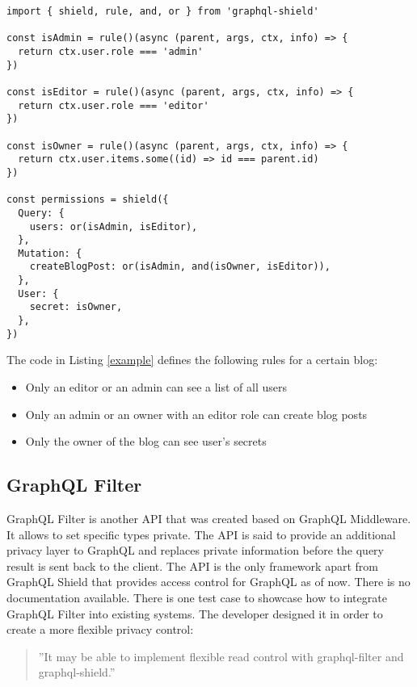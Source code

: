\documentclass[conference]{IEEEtran}
\begin{document}
\label{example}
\begin{lstlisting}[label=example,caption=Role-based Access Control \cite{b1}]
import { shield, rule, and, or } from 'graphql-shield'

const isAdmin = rule()(async (parent, args, ctx, info) => {
  return ctx.user.role === 'admin'
})

const isEditor = rule()(async (parent, args, ctx, info) => {
  return ctx.user.role === 'editor'
})

const isOwner = rule()(async (parent, args, ctx, info) => {
  return ctx.user.items.some((id) => id === parent.id)
})

const permissions = shield({
  Query: {
    users: or(isAdmin, isEditor),
  },
  Mutation: {
    createBlogPost: or(isAdmin, and(isOwner, isEditor)),
  },
  User: {
    secret: isOwner,
  },
})
\end{lstlisting}

The code in Listing \ref{example} defines the following rules for a certain blog:

\begin{itemize}
    \item Only an editor or an admin can see a list of all users
    \item Only an admin or an owner with an editor role can create blog posts
    \item Only the owner of the blog can see user's secrets
\end{itemize}


\subsection{GraphQL Filter}\label{filter}

GraphQL Filter is another API that was created based on GraphQL Middleware. It allows to set specific types private. The API is said to provide an additional privacy layer to GraphQL and replaces private information before the query result is sent back to the client. The API is the only framework apart from GraphQL Shield that provides access control for GraphQL as of now. There is no documentation available. There is one test case to showcase how to integrate GraphQL Filter into existing systems. The developer designed it in order to create a more flexible privacy control:\newline

 \begin{quote} ''It may be able to implement flexible read control with graphql-filter and graphql-shield.'' \cite{b2}\newline
 \end{quote}
\end{document}
